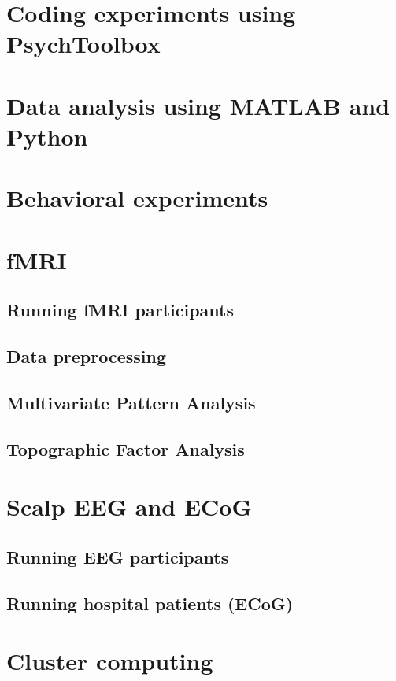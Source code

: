 \documentclass{tufte-book} %
\begin{document}
 \section{Coding experiments using PsychToolbox}
 \section{Data analysis using MATLAB and Python}



 \section{Behavioral experiments}

 \section{fMRI}
 \subsection{Running fMRI participants}
 \subsection{Data preprocessing}
 \subsection{Multivariate Pattern Analysis}
 \subsection{Topographic Factor Analysis}

 \section{Scalp EEG and ECoG}
 \subsection{Running EEG participants}
 \subsection{Running hospital patients (ECoG)}

 \section{Cluster computing}
\end{document}
